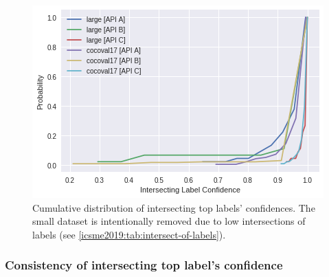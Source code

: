 \begin{table}[t!]
\caption[Evolution of top labels and confidence values]{Ratio of the top labels (to images) that remained the top label but changed confidence values between intervals.}
\label{icsme2019:tab:delta-confidences}
\centering
{}
\end{table}


\begin{figure}
  \centering
  \includegraphics[width=0.75\linewidth]{intersecting-cdf}
  \caption[Cumulative distribution of intersecting top label confidences]{Cumulative distribution of intersecting top labels' confidences. The small dataset is intentionally removed due to low intersections of labels (see \cref{icsme2019:tab:intersect-of-labels}).}
  \label{icsme2019:fig:intersecting-cdf}
\end{figure}

\subsubsection{Consistency of intersecting top label's confidence}

